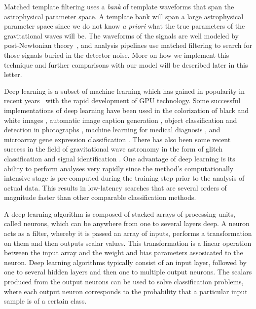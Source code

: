 \documentclass[%
showpacs,
 amsmath,amssymb,
 aps,
 twocolumn,
 prl,
 reprint,
floatfix,
]{revtex4-1}
\begin{document}
%
%
Matched template filtering uses a \textit{bank} \cite{PhysRevD.86.084017,1705.01845,PhysRevD.80.104014,PhysRevD.90.082004,PhysRevD.89.084041} of template waveforms \cite{PhysRevD.44.3819,PhysRevD.89.061502,PhysRevD.89.024003,Blanchet2014} that span
the astrophysical parameter space. A template bank will span a large astrophysical parameter space since we do not
know \textit{a priori} what the true parameters of the gravitational waves will
be. The waveforms of the signals are well modeled by post-Newtonian
theory~\cite{PhysRevD.84.049901,PhysRevD.80.084043,Blanchet2014,PhysRevD.93.084054},
and analysis pipelines use matched filtering to search for those signals buried
in the detector noise. More on how we implement this technique and further
comparisons with our model will be described later in this letter.

%
%
Deep learning is a subset of machine learning which has gained in popularity in
recent years~\cite{NIPS2012_4824, 1406.2661, 1409.1556, 1412.7062, 1311.2901,
1409.4842} with the rapid development of \ac{GPU} technology. Some successful
implementations of deep learning have been used in the colorization of black
and white images \cite{1603.08511}, automatic image caption generation
\cite{1412.2306}, object classification and detection in photographs
\cite{NIPS2012_4824}, machine learning for medical diagnosis \cite{KONONENKO200189}, and microarray gene expression classification \cite{Pirooznia2008}. There has also been some recent success in the field of gravitational wave astronomy in the form of glitch classification \cite{PhysRevD.95.104059, 0264-9381-34-6-064003,1706.07446} and signal identification \cite{1701.00008}. One
advantage of deep learning is its ability to perform analyses very rapidly
since the method's computationally intensive stage is pre-computed during the
training step prior to the analysis of actual data. This results in low-latency
searches that are several orders of magnitude faster than other
comparable classification methods. 

%
%
A deep learning algorithm is composed of stacked arrays of processing units, called
neurons, which can be anywhere from one to several layers deep. A neuron acts as a filter, whereby it is passed an array of inputs, performs a transformation on them and then outputs scalar values. This transformation is a linear operation between the input array and the weight and bias parameters assosicated to the neuron. Deep learning algorithms typically consist of an input layer, followed by one to several hidden layers
and then one to multiple output neurons. The scalars produced from the output neurons can be used to solve classification problems, where each output neuron corresponds to the probability
that a particular input sample is of a certain class.
\end{document}

